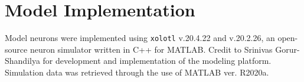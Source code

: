 \section{Model Implementation} \label{implementation}

Model neurons were implemented using \texttt{xolotl} v.20.4.22 and v.20.2.26, an open-source neuron simulator written in C++ for MATLAB\cite{gorur-shandilya_xolotl_2018}. Credit to Srinivas Gorur-Shandilya for development and implementation of the modeling platform. Simulation data was retrieved through the use of MATLAB ver. R2020a.




